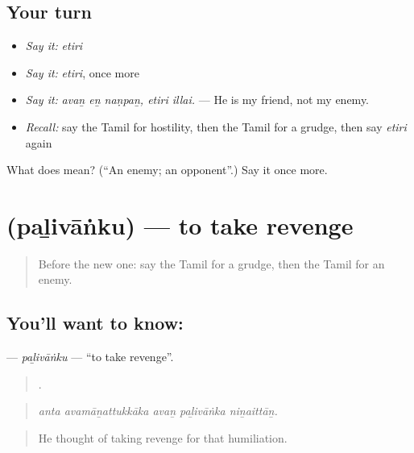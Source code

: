 \subsection*{Your turn}
\begin{itemize}
\raggedright
  \item \emph{Say it:} \emph{etiri}
  \item \emph{Say it:} \emph{etiri}, once more
  \item \emph{Say it:} \emph{avaṉ eṉ naṇpaṉ, etiri illai.} — He is my friend, not my enemy.
  \item \emph{Recall:} say the Tamil for hostility, then the Tamil for a grudge, then say \emph{etiri} again
\end{itemize}

\begin{tcolorbox}[breakable,colback=teal!4,colframe=teal!35!black,title={Before you move on}]
What does  mean? (\textquotedblleft{}An enemy; an opponent\textquotedblright{}.) Say it once more.
\end{tcolorbox}
\section[\texorpdfstring{\ta{பழிவாங்கு} (paḻivāṅku)}{பழிவாங்கு (paḻivāṅku)}]{ (paḻivāṅku) — to take revenge}

\label{lesson:TA-C469-palivanku}



\begin{quote}
Before the new one: say the Tamil for a grudge, then the Tamil for an enemy.
\end{quote}

\subsection*{You'll want to know: }
\textbf{} — \emph{paḻivāṅku} — \textquotedblleft{}to take revenge\textquotedblright{}.

\begin{quote}
    .
\end{quote}

\begin{quote}
\emph{anta avamāṉattukkāka avaṉ paḻivāṅka niṉaittāṉ.}
\end{quote}

\begin{quote}
He thought of taking revenge for that humiliation.
\end{quote}


